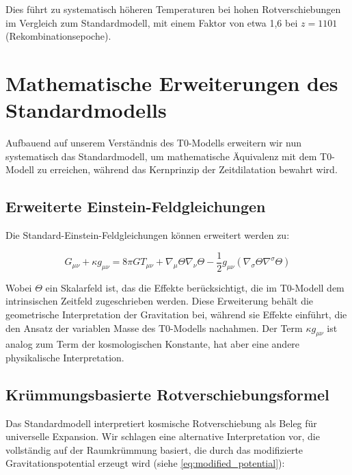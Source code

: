 \documentclass[12pt,a4paper]{article}
\begin{document}
	Dies führt zu systematisch höheren Temperaturen bei hohen Rotverschiebungen im Vergleich zum Standardmodell\cite{pascher_temp_2025}, mit einem Faktor von etwa 1,6 bei $z = 1101$ (Rekombinationsepoche).
	
	\section{Mathematische Erweiterungen des Standardmodells}
	\label{sec:mathematical_extensions}
	
	Aufbauend auf unserem Verständnis des T0-Modells erweitern wir nun systematisch das Standardmodell, um mathematische Äquivalenz mit dem T0-Modell zu erreichen, während das Kernprinzip der Zeitdilatation bewahrt wird.
	
	\subsection{Erweiterte Einstein-Feldgleichungen}
	\label{subsec:extended_einstein}
	
	Die Standard-Einstein-Feldgleichungen\cite{einstein1915} können erweitert werden zu:
	
	\begin{equation}
		\label{eq:extended_einstein}
		G_{\mu\nu} + \kappa g_{\mu\nu} = 8\pi G T_{\mu\nu} + \nabla_{\mu}\Theta\nabla_{\nu}\Theta - \frac{1}{2}g_{\mu\nu}(\nabla_{\sigma}\Theta\nabla^{\sigma}\Theta)
	\end{equation}
	
	Wobei $\Theta$ ein Skalarfeld ist, das die Effekte berücksichtigt, die im T0-Modell dem intrinsischen Zeitfeld zugeschrieben werden\cite{pascher_lagrange_2025}. Diese Erweiterung behält die geometrische Interpretation der Gravitation bei, während sie Effekte einführt, die den Ansatz der variablen Masse des T0-Modells nachahmen. Der Term $\kappa g_{\mu\nu}$ ist analog zum Term der kosmologischen Konstante, hat aber eine andere physikalische Interpretation\cite{pascher_emergente_gravitation_2025}.
	
	\subsection{Krümmungsbasierte Rotverschiebungsformel}
	\label{subsec:curvature_redshift}
	
	Das Standardmodell interpretiert kosmische Rotverschiebung als Beleg für universelle Expansion. Wir schlagen eine alternative Interpretation vor, die vollständig auf der Raumkrümmung basiert, die durch das modifizierte Gravitationspotential erzeugt wird (siehe \cref{eq:modified_potential}):
	
\end{document}
